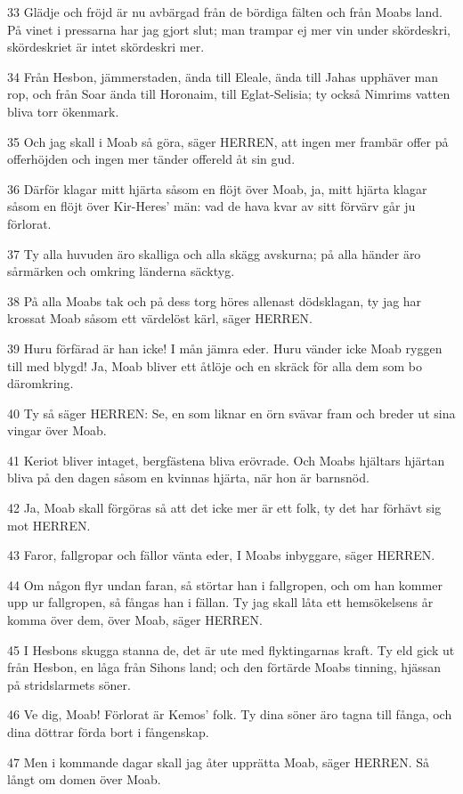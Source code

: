 \par 33 Glädje och fröjd är nu avbärgad från de bördiga fälten och från Moabs land. På vinet i pressarna har jag gjort slut; man trampar ej mer vin under skördeskri, skördeskriet är intet skördeskri mer.
\par 34 Från Hesbon, jämmerstaden, ända till Eleale, ända till Jahas upphäver man rop, och från Soar ända till Horonaim, till Eglat-Selisia; ty också Nimrims vatten bliva torr ökenmark.
\par 35 Och jag skall i Moab så göra, säger HERREN, att ingen mer frambär offer på offerhöjden och ingen mer tänder offereld åt sin gud.
\par 36 Därför klagar mitt hjärta såsom en flöjt över Moab, ja, mitt hjärta klagar såsom en flöjt över Kir-Heres' män: vad de hava kvar av sitt förvärv går ju förlorat.
\par 37 Ty alla huvuden äro skalliga och alla skägg avskurna; på alla händer äro sårmärken och omkring länderna säcktyg.
\par 38 På alla Moabs tak och på dess torg höres allenast dödsklagan, ty jag har krossat Moab såsom ett värdelöst kärl, säger HERREN.
\par 39 Huru förfärad är han icke! I mån jämra eder. Huru vänder icke Moab ryggen till med blygd! Ja, Moab bliver ett åtlöje och en skräck för alla dem som bo däromkring.
\par 40 Ty så säger HERREN: Se, en som liknar en örn svävar fram och breder ut sina vingar över Moab.
\par 41 Keriot bliver intaget, bergfästena bliva erövrade. Och Moabs hjältars hjärtan bliva på den dagen såsom en kvinnas hjärta, när hon är barnsnöd.
\par 42 Ja, Moab skall förgöras så att det icke mer är ett folk, ty det har förhävt sig mot HERREN.
\par 43 Faror, fallgropar och fällor vänta eder, I Moabs inbyggare, säger HERREN.
\par 44 Om någon flyr undan faran, så störtar han i fallgropen, och om han kommer upp ur fallgropen, så fångas han i fällan. Ty jag skall låta ett hemsökelsens år komma över dem, över Moab, säger HERREN.
\par 45 I Hesbons skugga stanna de, det är ute med flyktingarnas kraft. Ty eld gick ut från Hesbon, en låga från Sihons land; och den förtärde Moabs tinning, hjässan på stridslarmets söner.
\par 46 Ve dig, Moab! Förlorat är Kemos' folk. Ty dina söner äro tagna till fånga, och dina döttrar förda bort i fångenskap.
\par 47 Men i kommande dagar skall jag åter upprätta Moab, säger HERREN. Så långt om domen över Moab.

